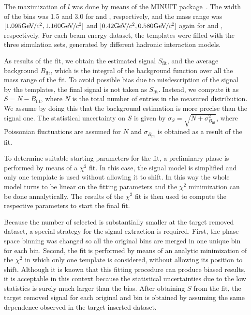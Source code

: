 The maximization of $l$ was done by means of the
MINUIT package~\cite{James:1975dr}. The width
of the \minv bins was 1.5 and 3.0 \MeVcc for
\lambs and \kzeros, respectively, and the mass range
was $[1.095 \mbox{Ge\kern-0.1em V}\kern-0.1em/\kern-0.05em c^2, 1.160 \mbox{Ge\kern-0.1em V}\kern-0.1em/\kern-0.05em c^2]$ and $[0.42 \mbox{Ge\kern-0.1em V}\kern-0.1em/\kern-0.05em c^2, 0.580 \mbox{Ge\kern-0.1em V}\kern-0.1em/\kern-0.05em c^2]$  
again for \lambs and \kzeros, respectively.
For each beam energy dataset, the templates were filled
with the three simulation sets, generated by different
hadronic interaction models.

As results of the fit, we obtain the estimated signal
$S_\text{fit}$, and the average background $B_\text{fit}$, which is the integral
of the background function over all the mass range of the fit.
To avoid possible bias due to misdescription of the signal
by the templates, the final signal is not taken as $S_\text{fit}$.
Instead, we compute it as $S = N - B_\text{fit}$,
where $N$ is the total number of entries in the measured \minv distribution.
We assume by doing this that the background estimation is more precise
than the signal one.
The statistical uncertainty on $S$ is given by $\sigma_S = \sqrt{N+\sigma_{B_\text{fit}}^2}$,
where Poissonian fluctuations are assumed for $N$ and $\sigma_{B_\text{fit}}$
is obtained as a result of the fit.

To determine suitable starting parameters for the fit,
a preliminary phase is performed by means of a $\chi^2$
fit. In this case, the signal model is simplified and
only one template is used without allowing it to shift.
In this way the whole model turns to be linear on the fitting
parameters and the $\chi^2$ minimization can be done annalytically.
The results of the $\chi^2$ fit
is then used to compute the respective parameters
to start the final fit.

Because the number of selected \vzeros is substantially smaller
at the target removed dataset, a special strategy for the signal
extraction is required. First, the phase space binning was
changed so all the original \pT bins are merged
in one unique bin for each \pp bin. Second, the \minv fit is performed
by means of an analytic minimization of the $\chi^2$
in which only one template is considered, without allowing
its position to shift. Although it is known that this fitting
procedure can produce biased results, it is acceptable in this
context because the statistical uncertainties due to the low
statistics is surely much larger than the bias.
After obtaining $S$ from the \minv fit, the target removed
signal for each original \pp and \pT bin is obtained by assuming
the same \pT dependence observed in the target inserted dataset.


